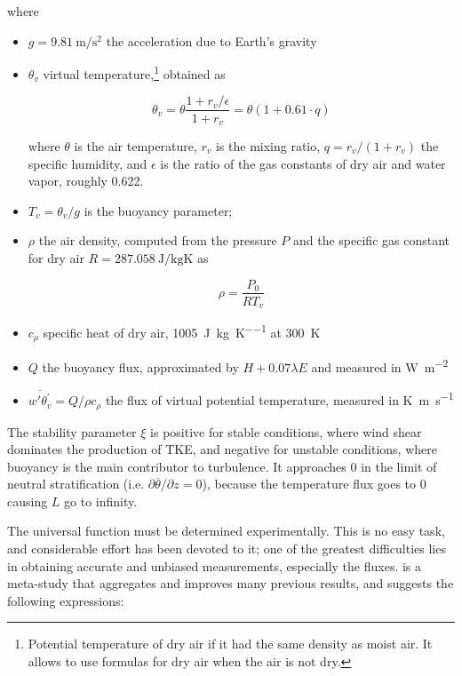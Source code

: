 \documentclass[a4paper,11pt]{kth-mag}
\begin{document}
\noindent where

\begin{itemize}
\item $g=\SI{9.81}{\meter\per\square\second}$ the acceleration due to Earth's gravity

\item $\theta_v$ virtual temperature,\footnote{Potential temperature of dry air if it had the same density as moist air. It allows to use formulas for dry air when the air is not dry.} obtained as

\begin{equation}
\label{eq:vtemp}
\theta_v=\theta\frac{1+r_v/\epsilon}{1+r_v}=\theta(1+0.61\cdot q)
\end{equation}

\noindent where $\theta$ is the air temperature, $r_v$ is the mixing ratio, $q=r_v/(1+r_v)$ the specific humidity, and $\epsilon$ is the ratio of the gas constants of dry air and water vapor, roughly 0.622.

\item $T_v=\theta_v/g$ is the buoyancy parameter;

\item $\rho$ the air density, computed from the pressure $P$ and the specific gas constant for dry air $R=\SI{287.058}{\joule\per\kilo\gram\kelvin}$ as

$$
\rho=\frac{P_0}{RT_v}
$$


\item $c_\rho$ specific heat of dry air, \SI{1005}{\joule\per\kilo\gram\per\kelvin} at \SI{300}{\kelvin}
\item $Q$ the buoyancy flux, approximated by $H+0.07\lambda E$ and measured in \si{\watt\per\square\meter}
\item $\overline{w'\theta^\prime_v}=Q/\rho c_\rho$ the flux of virtual potential temperature, measured in \si{\kelvin\meter\per\second}
\end{itemize}

The stability parameter $\xi$ is positive for stable conditions, where wind shear dominates the production of TKE, and negative for unstable conditions, where buoyancy is the main contributor to turbulence. It approaches 0 in the limit of neutral stratification (i.e. $\partial\overline{\theta}/\partial z=0$), because the temperature flux goes to 0 causing $L$ go to infinity.

The universal function must be determined experimentally. This is no easy task, and considerable effort has been devoted to it; one of the greatest difficulties lies in obtaining accurate and unbiased measurements, especially the fluxes. \cite{hogstrom88} is a meta-study that aggregates and improves many previous results, and suggests the following expressions:
\end{document}
